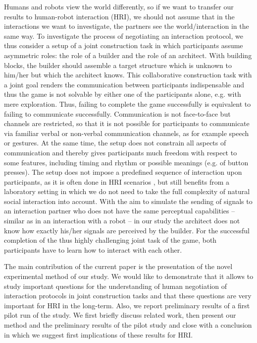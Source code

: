 Humans and robots view the world differently, so if we want to transfer our results to human-robot interaction (HRI), we should not assume that in the interactions we want to investigate, the partners see the world/interaction in the same way. To investigate the process of negotiating an interaction protocol, we thus consider a setup of a joint construction task in which participants assume asymmetric roles: the role of a builder and the role of an architect. With building blocks, the builder should assemble a target structure which is unknown to him/her but which the architect knows. This collaborative construction task with a joint goal renders the communication between participants indispensable and thus the game is not solvable by either one of the participants alone, e.g. with mere exploration. Thus, failing to complete the game successfully is equivalent to failing to communicate successfully.
Communication is not face-to-face but channels are restricted, so that it is not possible for participants to communicate via familiar verbal or non-verbal communication channels, as for example speech or gestures. At the same time, the setup does not constrain all aspects of communication and thereby gives participants much freedom with respect to some features, including timing and rhythm or possible meanings (e.g. of button presses). The setup does not impose a predefined sequence of interaction upon participants, as it is often done in HRI scenarios \cite{akgun12hri}, but still benefits from a laboratory setting in which we do not need to take the full complexity of natural social interaction into account. With the aim to simulate the sending of signals to an interaction partner who does not have the same perceptual capabilities -- similar as in an interaction with a robot -- in our study the architect does not know how exactly his/her signals are perceived by the builder. For the successful completion of the thus highly challenging joint task of the game, both participants have to learn how to interact with each other. 

The main contribution of the current paper is the presentation of the novel experimental method of our study. We would like to demonstrate that it allows to study important questions for the understanding of human negotiation of interaction protocols in joint construction tasks and that these questions are very important for HRI in the long-term. Also, we report preliminary results of a first pilot run of the study. We first briefly discuss related work, then present our method and the preliminary results of the pilot study and close with a conclusion in which we suggest first implications of these results for HRI.

